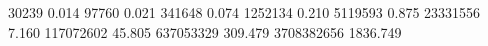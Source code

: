 30239      0.014
97760      0.021
341648     0.074
1252134    0.210
5119593    0.875
23331556   7.160
117072602  45.805
637053329  309.479
3708382656 1836.749
